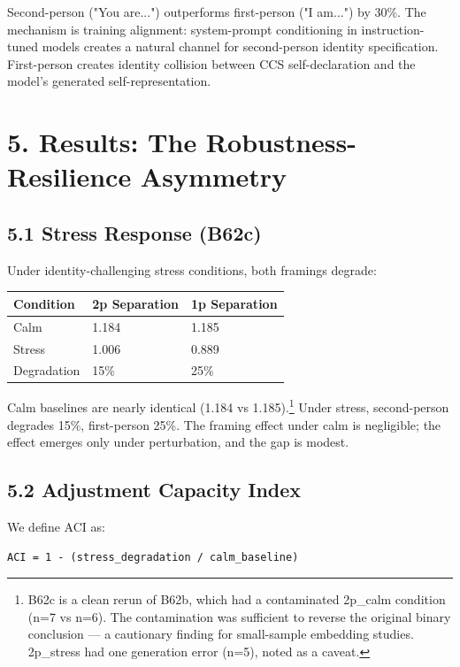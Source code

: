\documentclass[11pt]{article}
\begin{document}
Second-person ("You are...") outperforms first-person ("I am...") by 30\%.
The mechanism is training alignment: system-prompt conditioning in instruction-
tuned models creates a natural channel for second-person identity specification.
First-person creates identity collision between CCS self-declaration and the
model's generated self-representation.


\section{5. Results: The Robustness-Resilience Asymmetry}

\subsection{5.1 Stress Response (B62c)}

Under identity-challenging stress conditions, both framings degrade:

\begin{table}[h]\centering
\begin{tabular}{lll}
\toprule
Condition & 2p Separation & 1p Separation \\
\midrule
Calm & 1.184 & 1.185 \\
Stress & 1.006 & 0.889 \\
Degradation & 15\% & 25\% \\
\bottomrule
\end{tabular}
\end{table}

Calm baselines are nearly identical (1.184 vs 1.185).\footnote{B62c is a clean rerun
of B62b, which had a contaminated 2p\_calm condition (n=7 vs n=6). The
contamination was sufficient to reverse the original binary conclusion ---
a cautionary finding for small-sample embedding studies. 2p\_stress had one
generation error (n=5), noted as a caveat.} Under stress, second-person
degrades 15\%, first-person 25\%. The framing effect under calm is negligible;
the effect emerges only under perturbation, and the gap is modest.

\subsection{5.2 Adjustment Capacity Index}

We define ACI as:

\begin{verbatim}
ACI = 1 - (stress_degradation / calm_baseline)
\end{verbatim}
\end{document}

